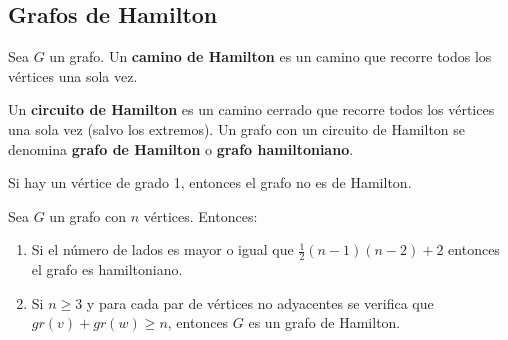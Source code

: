 \subsection{Grafos de Hamilton}
\begin{ndef}
    Sea $G$ un grafo. Un \textbf{camino de Hamilton} es un camino que recorre todos los vértices una sola vez.
\end{ndef}
Un \textbf{circuito de Hamilton} es un camino cerrado que recorre todos los vértices una sola vez (salvo los extremos). Un grafo con un circuito de Hamilton se denomina \textbf{grafo de Hamilton} o \textbf{grafo hamiltoniano}.
\begin{obs}
    Si hay un vértice de grado 1, entonces el grafo no es de Hamilton.
\end{obs}
\begin{nth}
    Sea $G$ un grafo con $n$ vértices. Entonces:
    \begin{enumerate}
        \item Si el número de lados es mayor o igual que $\frac{1}{2}(n-1)(n-2) + 2$ entonces el grafo es hamiltoniano.
        \item Si $n\geq 3$ y para cada par de vértices no adyacentes se verifica que $gr(v) +gr(w)\geq n$, entonces $G$ es un grafo de Hamilton.
    \end{enumerate}
\end{nth}

